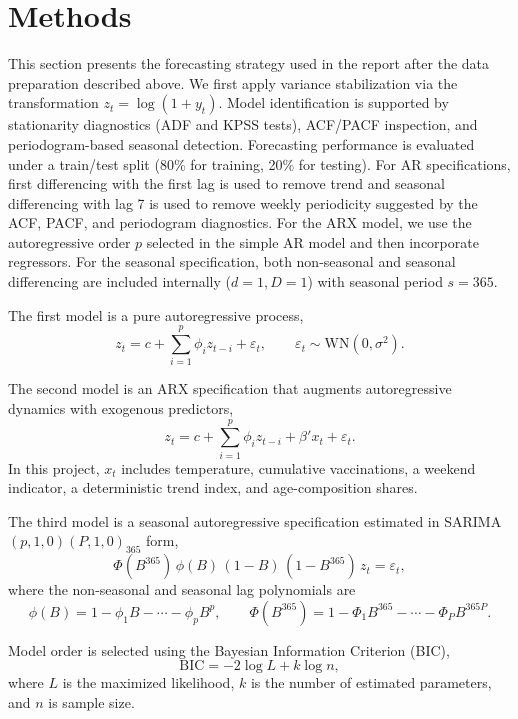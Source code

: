 ﻿\documentclass[12pt,a4paper]{article}
\begin{document}
\section{Methods}
\label{sec:methods}

This section presents the forecasting strategy used in the report after the data preparation described above. We first apply variance stabilization via the transformation \(z_t = \log(1+y_t)\). Model identification is supported by stationarity diagnostics (ADF and KPSS tests), ACF/PACF inspection, and periodogram-based seasonal detection. Forecasting performance is evaluated under a train/test split (80\% for training, 20\% for testing). For AR specifications, first differencing with the first lag is used to remove trend and seasonal differencing with lag 7 is used to remove weekly periodicity suggested by the ACF, PACF, and periodogram diagnostics. For the ARX model, we use the autoregressive order \(p\) selected in the simple AR model and then incorporate regressors. For the seasonal specification, both non-seasonal and seasonal differencing are included internally (\(d=1, D=1\)) with seasonal period \(s=365\).

The first model is a pure autoregressive process,
\begin{equation}
z_t = c + \sum_{i=1}^{p} \phi_i z_{t-i} + \varepsilon_t,
\qquad \varepsilon_t \sim \text{WN}(0,\sigma^2).
\end{equation}

The second model is an ARX specification that augments autoregressive dynamics with exogenous predictors,
\begin{equation}
z_t = c + \sum_{i=1}^{p} \phi_i z_{t-i} + \beta' x_t + \varepsilon_t.
\end{equation}
In this project, \(x_t\) includes temperature, cumulative vaccinations, a weekend indicator, a deterministic trend index, and age-composition shares.

The third model is a seasonal autoregressive specification estimated in SARIMA\((p,1,0)(P,1,0)_{365}\) form,
\begin{equation}
\Phi(B^{365})\,\phi(B)\,(1-B)\,(1-B^{365})\,z_t = \varepsilon_t,
\end{equation}
where the non-seasonal and seasonal lag polynomials are
\begin{equation}
\phi(B)=1-\phi_1 B-\cdots-\phi_p B^p,
\qquad
\Phi(B^{365})=1-\Phi_1 B^{365}-\cdots-\Phi_P B^{365P}.
\end{equation}

Model order is selected using the Bayesian Information Criterion (BIC),
\begin{equation}
\text{BIC} = -2\log L + k\log n,
\end{equation}
where \(L\) is the maximized likelihood, \(k\) is the number of estimated parameters, and \(n\) is sample size.
\end{document}
